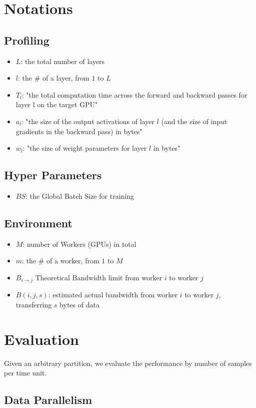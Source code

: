 \documentclass[12pt,letterpaper]{article}
\begin{document}
\section {Notations}
\subsection {Profiling}
\begin{itemize}
	\item $L$: the total number of layers
	\item $l$: the \# of a layer, from $1$ to $L$
	\item $T_l$: "the total computation time across the forward and backward passes for layer l on the target GPU"
	\item $a_l$: "the size of the output activations of layer $l$ (and the size of input gradients in the backward pass) in bytes"
	\item $w_l$: "the size of weight parameters for layer $l$ in bytes"
\end{itemize}
\subsection {Hyper Parameters}
\begin{itemize}
	\item $BS$: the Global Batch Size for training
\end{itemize}
\subsection {Environment}
\begin{itemize}
	\item $M$: number of Workers (GPUs) in total
	\item $m$: the \# of a worker, from $1$ to $M$
	\item $B_{i \rightarrow j}$ Theoretical Bandwidth limit from worker $i$ to worker $j$
	\item $B(i,j,s)$: estimated actual bandwidth from worker $i$ to worker $j$, transferring $s$ bytes of data
\end{itemize}

\section* {Evaluation}
Given an arbitrary partition, we evaluate the performance by number of samples per time unit.

\subsection* {Data Parallelism}
\end{document}

